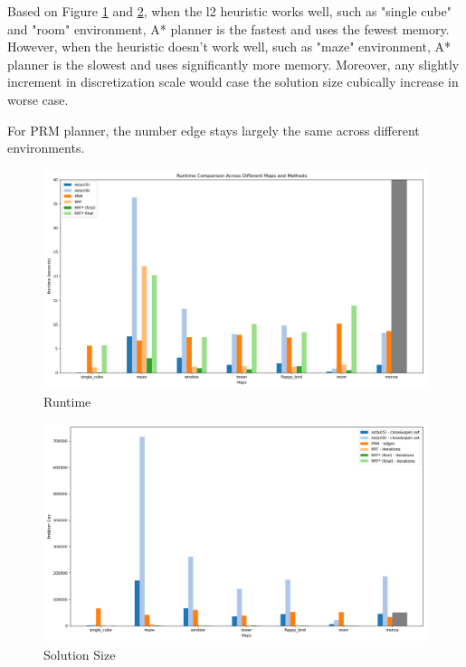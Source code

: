 \documentclass[conference]{IEEEtran}
\begin{document}
Based on Figure \ref{fig:runtime} and \ref{fig:sol-size},
when the l2 heuristic works well, such as "single cube" and "room" environment,
A* planner is the fastest and uses the fewest memory.
However, when the heuristic doesn't work well, such as "maze" environment,
A* planner is the slowest and uses significantly more memory. 
Moreover, any slightly increment in discretization scale would case the solution size cubically increase in worse case.

For PRM planner, the number edge stays largely the same 
across different environments.

\begin{figure}
    \centering
    \includegraphics[width=\linewidth]{img/runtime.png}
    \caption{Runtime}
    \label{fig:runtime}
\end{figure}

\begin{figure}
    \centering
    \includegraphics[width=\linewidth]{img/problem_size.png}
    \caption{Solution Size}
    \label{fig:sol-size}
\end{figure}
\end{document}

